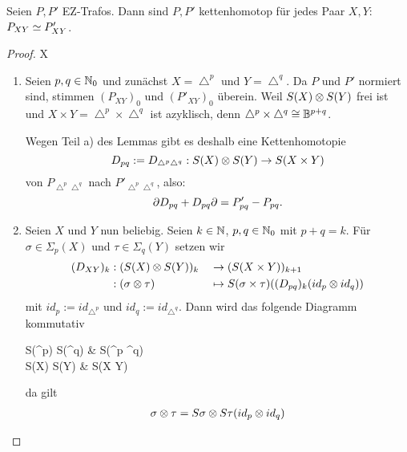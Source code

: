 \begin{proposition}
	Seien $P, P'$ EZ-Trafos. Dann sind $P, P'$ kettenhomotop für jedes Paar $X,Y$: $P_{XY} \simeq P'_{XY}$.
\end{proposition}
\begin{proof}X
	\begin{enumerate}
	\item Seien $p,q \in \mathbb{N}_0$ und zunächst $X = \bigtriangleup^p$ und $Y = \bigtriangleup^q$.
	Da $P$ und $P'$ normiert sind, stimmen $(P_{XY})_0$ und $(P'_{XY})_0$ überein.
	Weil $S(X) \otimes S(Y)$ frei ist und $X\times Y = \bigtriangleup^p \times \bigtriangleup^q$ ist azyklisch, denn $\bigtriangleup^p \times \bigtriangleup^q \cong \mathbb{B}^{p+q}$.
	
	Wegen Teil a) des Lemmas gibt es deshalb eine Kettenhomotopie
	\begin{equation*}
		D_{pq} := D_{\bigtriangleup^p \bigtriangleup^q} : S(X) \otimes S(Y) \rightarrow S(X \times Y)
	\end{equation*}
	von $P_{\bigtriangleup^p \bigtriangleup^q}$ nach $P'_{\bigtriangleup^p \bigtriangleup^q}$, also:
	\begin{equation*}
		\partial D_{pq} + D_{pq}\partial = P'_{pq} - P_{pq}.
	\end{equation*}
	\item Seien $X$ und $Y$ nun beliebig.
	Seien $k \in \mathbb{N}$, $p,q \in \mathbb{N}_0$ mit $p + q = k$.
	Für $\sigma \in \Sigma_p(X)$ und $\tau \in \Sigma_q(Y)$ setzen wir
	\begin{align*}
		(D_{XY})_k &: (S(X) \otimes S(Y))_k &&\rightarrow (S(X\times Y))_{k+1} \\
		&: (\sigma \otimes \tau) &&\mapsto S(\sigma \times \tau)((D_{pq})_k (id_p \otimes id_q))
	\end{align*}
	mit $id_p := id_{\bigtriangleup^p}$ und $id_q := id_{\bigtriangleup^q}$.
	Dann wird das folgende Diagramm kommutativ
	\begin{center}	
	\begin{cd}
		S(\bigtriangleup^p) \tensor S(\bigtriangleup^q) \ar[r, "D_{pq}"]  & S(\bigtriangleup^p \times \bigtriangleup^q) \\
		S(X) \tensor S(Y) \ar[r, "D_{XY}", swap] & S(X \times Y)
	\end{cd}
	\end{center}
	da gilt
	\begin{align*}
		\sigma \otimes \tau = S\sigma \otimes S\tau (id_p \otimes id_q)
	\end{align*}
	

\end{enumerate}
\end{proof}
